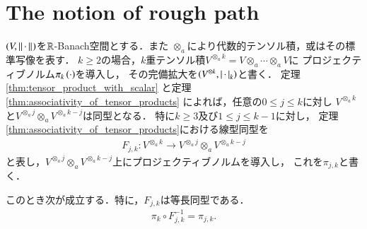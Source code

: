 \section{The notion of rough path}
	$(V,\left\|\, \cdot\, \right\|_{})$を$\mathbb{R}$-Banach空間とする．また
	$\otimes_a$により代数的テンソル積，或はその標準写像を表す．
	$k \geq 2$の場合，$k$重テンソル積$V^{\otimes_a k} = V \otimes_a \cdots \otimes_a V$に
	プロジェクティブノルム$\pi_{k}\left( \cdot \right)$を導入し，
	その完備拡大を$(V^{\otimes k},\left|\, \cdot\, \right|_{k})$と書く．
	定理\ref{thm:tensor_product_with_scalar}
	と定理\ref{thm:associativity_of_tensor_products}
	によれば，任意の$0 \leq j \leq k$に対し
	$V^{\otimes_a k}$と$V^{\otimes_a j} \otimes_a V^{\otimes_a k-j}$は同型となる．
	特に$k \geq 3$及び$1 \leq j \leq k-1$に対し，
	定理\ref{thm:associativity_of_tensor_products}における線型同型を
	\begin{align}
		F_{j,k}:V^{\otimes_a k} \longrightarrow V^{\otimes_a j} \otimes_a V^{\otimes_a k-j}
	\end{align}
	と表し，$V^{\otimes_a j} \otimes_a V^{\otimes_a k-j}$上にプロジェクティブノルムを導入し，
	これを$\pi_{j,k}$と書く．
	\begin{screen}
		\begin{thm}
			このとき次が成立する．特に，$F_{j,k}$は等長同型である．
			\begin{align}
				\pi_k \circ F^{-1}_{j,k} = \pi_{j,k}.
			\end{align}
			
		\end{thm}
	\end{screen}
	
